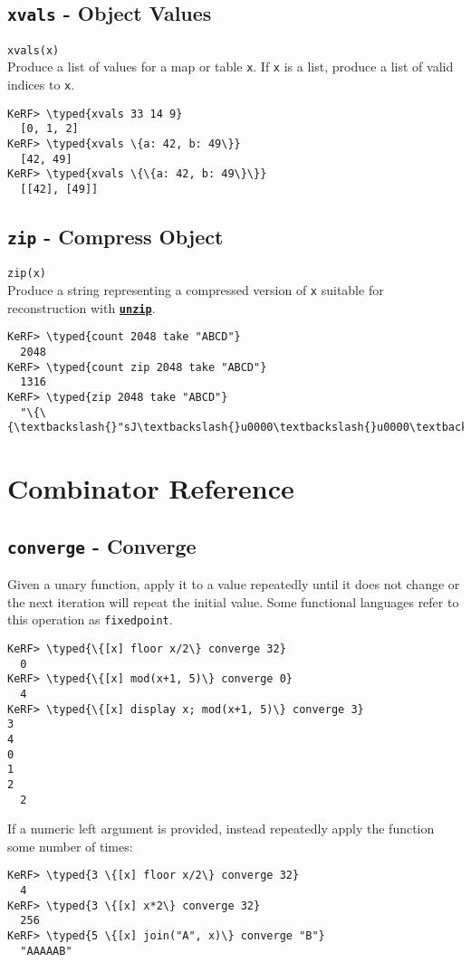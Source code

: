 \documentclass{article}
\newcommand{\typed}[1]{\textcolor{TealBlue}{#1}}
\newcommand{\primdefu}[3]{\subsection{\texttt{#1} - #2}\label{prim:#3}}
\newcommand{\primu}[2]{\hyperref[prim:#2]{\textbf{\texttt{#1}}}}
\newcommand{\primdef}[2]{\primdefu{#1}{#2}{#1}}
\newcommand{\prim}[1]{\primu{#1}{#1}}
\newcommand{\combdef}[2]{\primdefu{#1}{#2}{#1}}
\begin{document}
\primdef{xvals}{Object Values}
\texttt{xvals(x)}\\

Produce a list of values for a map or table \texttt{x}. If \texttt{x} is a list, produce a list of valid indices to \texttt{x}.

\begin{Verbatim}
KeRF> \typed{xvals 33 14 9}
  [0, 1, 2]
KeRF> \typed{xvals \{a: 42, b: 49\}}
  [42, 49]
KeRF> \typed{xvals \{\{a: 42, b: 49\}\}}
  [[42], [49]]
\end{Verbatim}

\primdef{zip}{Compress Object}
\texttt{zip(x)}\\

Produce a string representing a compressed version of \texttt{x} suitable for reconstruction with \prim{unzip}.

\begin{Verbatim}
KeRF> \typed{count 2048 take "ABCD"}
  2048
KeRF> \typed{count zip 2048 take "ABCD"}
  1316
KeRF> \typed{zip 2048 take "ABCD"}
  "\{\{\textbackslash{}"sJ\textbackslash{}u0000\textbackslash{}u0000\textbackslash{}u0000\textbackslash{}u00ca\textbackslash{}u0000\textbackslash{}u0000\textbackslash{}u0000\textbackslash{}u00ca\textbackslash{}u0000\textbackslash{}u0000\textbackslash{}u0000...
\end{Verbatim}

\pagebreak
\section {Combinator Reference}

\combdef{converge}{Converge}

Given a unary function, apply it to a value repeatedly until it does not change or the next iteration will repeat the initial value. Some functional languages refer to this operation as \texttt{fixedpoint}.
\begin{Verbatim}
KeRF> \typed{\{[x] floor x/2\} converge 32}
  0
KeRF> \typed{\{[x] mod(x+1, 5)\} converge 0}
  4
KeRF> \typed{\{[x] display x; mod(x+1, 5)\} converge 3}
3
4
0
1
2
  2
\end{Verbatim}

If a numeric left argument is provided, instead repeatedly apply the function some number of times:
\begin{Verbatim}
KeRF> \typed{3 \{[x] floor x/2\} converge 32}
  4
KeRF> \typed{3 \{[x] x*2\} converge 32}
  256
KeRF> \typed{5 \{[x] join("A", x)\} converge "B"}
  "AAAAAB"
\end{Verbatim}
\end{document}
